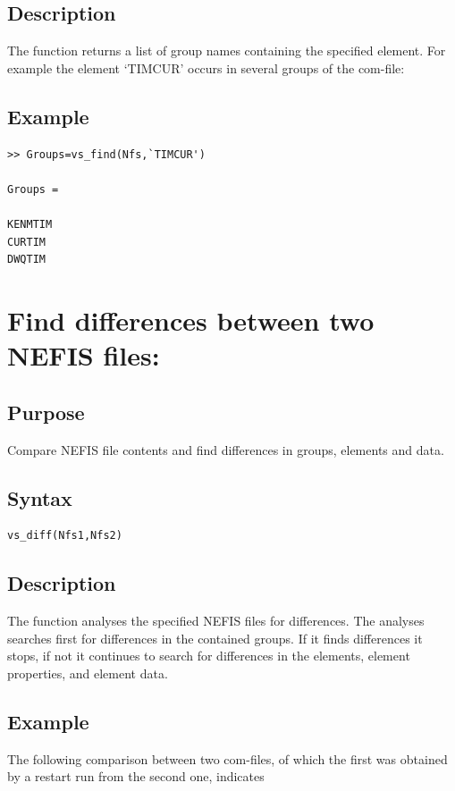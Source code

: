 \subsection*{Description}
The function returns a list of group names containing the specified element.
For example the element `TIMCUR' occurs in several groups of the com-file:

\subsection*{Example}
\begin{Verbatim}
>> Groups=vs_find(Nfs,`TIMCUR')

Groups =

KENMTIM
CURTIM
DWQTIM
\end{Verbatim}

\section{Find differences between two NEFIS files: \vsdiff}

\subsection*{Purpose}
Compare NEFIS file contents and find differences in groups, elements and data.

\subsection*{Syntax}
\begin{Verbatim}
vs_diff(Nfs1,Nfs2)
\end{Verbatim}

\subsection*{Description}
The function analyses the specified NEFIS files for differences.
The analyses searches first for differences in the contained groups.
If it finds differences it stops, if not it continues to search for differences in the elements, element properties, and element data.

\subsection*{Example}
The following comparison between two com-files, of which the first was obtained by a restart run from the second one, indicates


